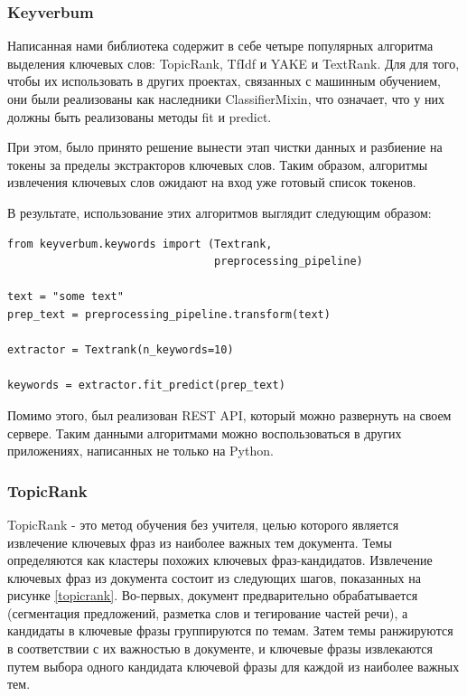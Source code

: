 \documentclass[14pt]{matmex-diploma-custom}
\begin{document}
\subsubsection{Keyverbum}
Написанная нами библиотека содержит в себе четыре популярных алгоритма выделения ключевых слов: TopicRank, TfIdf и YAKE и TextRank.
Для для того, чтобы их использовать в других проектах, связанных с машинным обучением, они были реализованы как наследники
ClassifierMixin, что означает, что у них должны быть реализованы методы fit и predict.

При этом, было принято решение вынести этап чистки данных и разбиение на токены за пределы экстракторов ключевых слов.
Таким образом, алгоритмы извлечения ключевых слов ожидают на вход уже готовый список токенов.

В результате, использование этих алгоритмов выглядит следующим образом:

\begin{verbatim}
from keyverbum.keywords import (Textrank, 
                                preprocessing_pipeline)

text = "some text"
prep_text = preprocessing_pipeline.transform(text)

extractor = Textrank(n_keywords=10)

keywords = extractor.fit_predict(prep_text)

\end{verbatim}

Помимо этого, был реализован REST API, который можно развернуть на своем сервере.
Таким данными алгоритмами можно воспользоваться в других приложениях, написанных не
только на Python.


\subsubsection{TopicRank}
TopicRank - это метод обучения без учителя, целью которого является извлечение ключевых фраз из наиболее важных тем документа. Темы определяются как кластеры похожих ключевых фраз-кандидатов. Извлечение ключевых фраз из документа состоит из следующих шагов, показанных на рисунке \ref{topicrank}. Во-первых, документ предварительно обрабатывается (сегментация предложений, разметка слов и тегирование частей речи), а кандидаты в ключевые фразы группируются по темам. Затем темы ранжируются в соответствии с их важностью в документе, и ключевые фразы извлекаются путем выбора одного кандидата ключевой фразы для каждой из наиболее важных тем.
\end{document}

